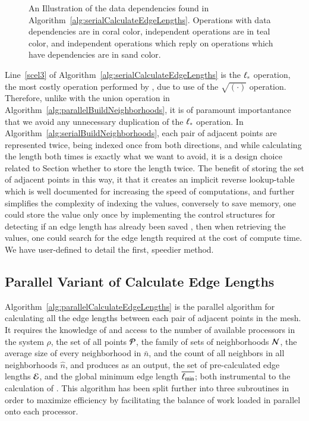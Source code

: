 \begin{figure}[ht]
	
	{\caption[Data Dependencies in Serial Algorithm~\ref{alg:serialCalculateEdgeLengths}: Calculate Edge Lengths]{An Illustration of the data dependencies found in Algorithm~\ref{alg:serialCalculateEdgeLengths}. Operations with data dependencies are in coral color, independent operations are in teal color, and independent operations which reply on operations which have dependencies are in sand color.}\label{fig:sacelDataDependencies}}
\end{figure}

Line~\ref{scel3} of Algorithm~\ref{alg:serialCalculateEdgeLengths} is the $\ell_\ast$ operation, the most costly operation performed by , due to use of the $\sqrt{(\cdot)}$ operation. Therefore, unlike with the union operation in Algorithm~\ref{alg:parallelBuildNeighborhoods}, it is of paramount importantance that we avoid any unnecessary duplication of the $\ell_\ast$ operation. In Algorithm~\ref{alg:serialBuildNeighborhoods}, each pair of adjacent points are represented twice, being indexed once from both directions, and while calculating the length both times is exactly what we want to avoid, it is a design choice related to Section whether to store the length twice. The benefit of storing the set of adjacent points in this way, it that it creates an implicit reverse lookup-table which is well documented for increasing the speed of computations, and further simplifies the complexity of indexing the values, conversely to save memory, one could store the value only once by implementing the control structures for detecting if an edge length has already been saved , then when retrieving the values, one could search for the edge length required at the cost of compute time. We have user-defined to detail the first, speedier method.

%
%
\subsection{Parallel Variant of Calculate Edge Lengths}
\label{ch6sCELPssPVCEL}
Algorithm~\ref{alg:parallelCalculateEdgeLengths} is the parallel algorithm for calculating all the edge lengths between each pair of adjacent points in the mesh. It requires the knowledge of and access to the number of available processors in the system $\rho$, the set of all points $\mathcal{P}$, the family of sets of neighborhoods $\mathcal{N}$, the average size of every neighborhood in $\bar{n}$, and the count of all neighbors in all neighborhoods $\hat{n}$, and produces as an output, the set of pre-calculated edge lengths $\mathcal{E}$, and the global minimum edge length $\overline{\ell_\text{min}}$; both instrumental to the calculation of . This algorithm has been split further into three subroutines in order to maximize efficiency by facilitating the balance of work loaded in parallel onto each processor.

